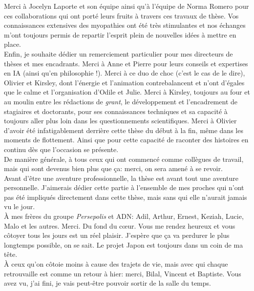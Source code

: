 Merci à Jocelyn Laporte et son équipe ainsi qu'à l'équipe de Norma Romero pour ces collaborations qui ont porté leurs fruits à travers ces travaux de thèse. Vos connaissances extensives des myopathies ont été très stimulantes et nos échanges m'ont toujours permis de repartir l'esprit plein de nouvelles idées à mettre en place. \\

Enfin, je souhaite dédier un remerciement particulier pour mes directeurs de thèses et mes encadrants. Merci à Anne et Pierre pour leurs conseils et expertises en IA (ainsi qu'en philosophie !). Merci à ce duo de choc (c'est le cas de le dire), Olivier et Kirsley, dont l'énergie et l'animation contrebalancent et n'ont d'égales que le calme et l'organisation d'Odile et Julie. Merci à Kirsley, toujours au four et au moulin entre les rédactions de \textit{grant}, le développement et l'encadrement de stagiaires et doctorants, pour ses connaissances techniques et sa capacité à toujours aller plus loin dans les questionnements scientifiques. Merci à Olivier d'avoir été infatigablement derrière cette thèse du début à la fin, même dans les moments de flottement. Ainsi que pour cette capacité de raconter des histoires en continu dès que l'occasion se présente. \\

De manière générale, à tous ceux qui ont commencé comme collègues de travail, mais qui sont devenus bien plus que ça: merci, on sera amené à se revoir. \\

Avant d'être une aventure professionnelle, la thèse est avant tout une aventure personnelle. J'aimerais dédier cette partie à l'ensemble de mes proches qui n'ont pas été impliqués directement dans cette thèse, mais sans qui elle n'aurait jamais vu le jour. \\

À mes frères du groupe \textit{Persepolis} et ADN: Adil, Arthur, Ernest, Keziah, Lucie, Malo et les autres. Merci. Du fond du cœur. Vous me rendez heureux et vous côtoyer tous les jours est un réel plaisir. J'espère que ça va perdurer le plus longtemps possible, on se sait. Le projet Japon est toujours dans un coin de ma tête. \\

À ceux qu'on côtoie moins à cause des trajets de vie, mais avec qui chaque retrouvaille est comme un retour à hier: merci, Bilal, Vincent et Baptiste. Vous avez vu, j'ai fini, je vais peut-être pouvoir sortir de la salle du temps. \\


